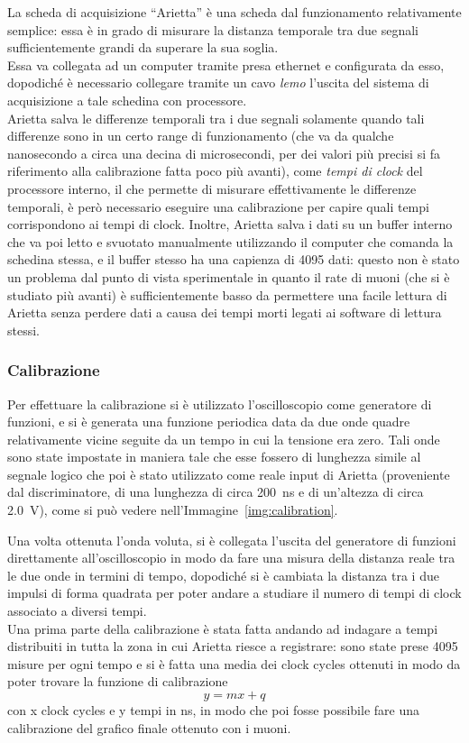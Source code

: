 La scheda di acquisizione ``Arietta'' è una scheda dal funzionamento relativamente semplice: essa è in grado di misurare la distanza temporale tra due segnali sufficientemente grandi da superare la sua soglia.\\
Essa va collegata ad un computer tramite presa ethernet e configurata da esso, dopodiché è necessario collegare tramite un cavo \textit{lemo} l'uscita del sistema di acquisizione a tale schedina con processore.\\
Arietta salva le differenze temporali tra i due segnali solamente quando tali differenze sono in un certo range di funzionamento (che va da qualche nanosecondo a circa una decina di microsecondi, per dei valori più precisi si fa riferimento alla calibrazione fatta poco più avanti), come \textit{tempi di clock} del processore interno, il che permette di misurare effettivamente le differenze temporali, è però necessario eseguire una calibrazione per capire quali tempi corrispondono ai tempi di clock. Inoltre, Arietta salva i dati su un buffer interno che va poi letto e svuotato manualmente utilizzando il computer che comanda la schedina stessa, e il buffer stesso ha una capienza di 4095 dati: questo non è stato un problema dal punto di vista sperimentale in quanto il rate di muoni (che si è studiato più avanti) è sufficientemente basso da permettere una facile lettura di Arietta senza perdere dati a causa dei tempi morti legati ai software di lettura stessi.\\

\subsubsection{Calibrazione}
Per effettuare la calibrazione si è utilizzato l'oscilloscopio come generatore di funzioni, e si è generata una funzione periodica data da due onde quadre relativamente vicine seguite da un tempo in cui la tensione era zero. Tali onde sono state impostate in maniera tale che esse fossero di lunghezza simile al segnale logico che poi è stato utilizzato come reale input di Arietta (proveniente dal discriminatore, di una lunghezza di circa 200~ns e di un'altezza di circa 2.0~V), come si può vedere nell'Immagine~\ref{img:calibration}.\\

Una volta ottenuta l'onda voluta, si è collegata l'uscita del generatore di funzioni direttamente all'oscilloscopio in modo da fare una misura della distanza reale tra le due onde in termini di tempo, dopodiché si è cambiata la distanza tra i due impulsi di forma quadrata per poter andare a studiare il numero di tempi di clock associato a diversi tempi.\\
Una prima parte della calibrazione è stata fatta andando ad indagare a tempi distribuiti in tutta la zona in cui Arietta riesce a registrare: sono state prese 4095 misure per ogni tempo e si è fatta una media dei clock cycles ottenuti in modo da poter trovare la funzione di calibrazione
$$y = mx +q$$
con x clock cycles e y tempi in ns, in modo che poi fosse possibile fare una calibrazione del grafico finale ottenuto con i muoni.\\

